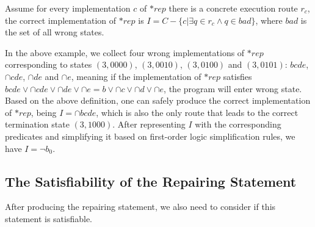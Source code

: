 \begin{definition}
\label{definition:CorrentREP}
Assume for every implementation $c$ of $*rep$ there is a concrete execution route $r_{c}$, the correct implementation of $*rep$ is $I = C - \{c | \exists q \in r_{c} \wedge q \in bad\}$, where $bad$ is the set of all wrong states.
\end{definition}

In the above example, we collect four wrong implementations of $*rep$ corresponding to states $(3,0000)$, $(3,0010)$, $(3,0100)$ and $(3,0101)$: $bcde$, $\cap{c}de$, $\cap{d}e$ and $\cap{e}$,
meaning if the implementation of $*rep$ satisfies $bcde \vee \cap{c}de \vee \cap{d}e \vee \cap{e} = b \vee \cap{c} \vee \cap{d} \vee \cap{e}$, the program will enter wrong state.
Based on the above definition, one can safely produce the correct implementation of $*rep$, being $I = \cap{b}cde$, which is also the only route that leads to the correct termination state $(3,1000)$.
After representing $I$ with the corresponding predicates and simplifying it based on first-order logic simplification rules, we have $I = \neg b_{0}$.

\subsection{The Satisfiability of the Repairing Statement}
\label{section:TheSatisfiabilityOfTheRepairingStatement}
After producing the repairing statement, we also need to consider if this statement is satisfiable.

